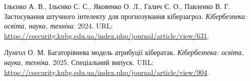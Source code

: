  Ільєнко А. В., Ільєнко С. С., Яковенко О. Л., Галич Є. О., Павленко В. Г. Застосування штучного інтелекту для прогнозування кіберзагроз. \emph{Кібербезпека: освіта, наука, техніка}. 2024. URL: \url{https://csecurity.kubg.edu.ua/index.php/journal/article/view/631}.

 Лунгол О. М. Багаторівнева модель атрибуції кібератак. \emph{Кібербезпека: освіта, наука, техніка}. 2025. Спеціальний випуск. URL: \url{https://csecurity.kubg.edu.ua/index.php/journal/article/view/904}.
